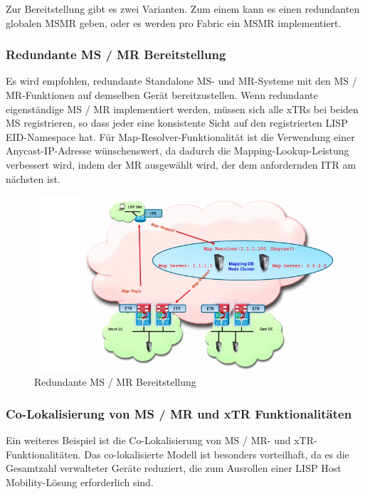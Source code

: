 Zur Bereitstellung gibt es zwei Varianten. Zum einem kann es einen redundanten globalen MSMR geben, oder es werden pro Fabric ein MSMR implementiert.

\subsubsection{Redundante MS / MR Bereitstellung}

Es wird empfohlen, redundante Standalone MS- und MR-Systeme mit den MS / MR-Funktionen auf demselben Gerät bereitzustellen. Wenn redundante eigenständige MS / MR implementiert werden, müssen sich alle xTRs bei beiden MS registrieren, so dass jeder eine konsistente Sicht auf den registrierten LISP EID-Namespace hat. Für Map-Resolver-Funktionalität ist die Verwendung einer Anycast-IP-Adresse wünschenswert, da dadurch die Mapping-Lookup-Leistung verbessert wird, indem der MR ausgewählt wird, der dem anfordernden ITR am nächsten ist.

\begin{figure}[H]
	\centering
	\includegraphics[width=1\linewidth]{img/Absicherung/LISP-Example}
	\caption{Redundante MS / MR Bereitstellung \cite{LISP-mobility} }
	\label{fig:Redundante MS / MR Bereitstellung}
\end{figure}

\subsubsection{Co-Lokalisierung von MS / MR und xTR Funktionalitäten}

Ein weiteres Beispiel ist die Co-Lokalisierung  von MS / MR- und xTR-Funktionalitäten. Das co-lokalisierte Modell ist besonders vorteilhaft, da es die Gesamtzahl verwalteter Geräte reduziert, die zum Ausrollen einer LISP Host Mobility-Lösung erforderlich sind. 

